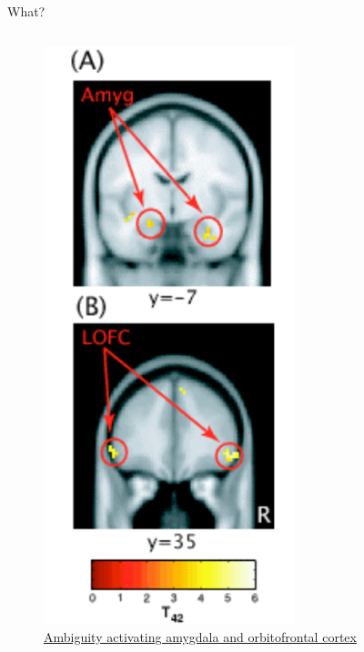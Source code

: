 \documentclass{beamer}
\theoremstyle{definition}
\begin{document}
\begin{frame}{What?}
\begin{columns}
\begin{column}{0.3\textwidth}
    \begin{figure}
    \centering
        \includegraphics[width=0.65\textwidth]{img/BrainDecisionMaking.png}
        \caption{\scriptsize \centering 
        \href{https://thesis.library.caltech.edu/470/}{Ambiguity activating amygdala and orbitofrontal cortex}}
    \end{figure}

\end{column}
        

\end{columns}

\end{frame}
\end{document}
